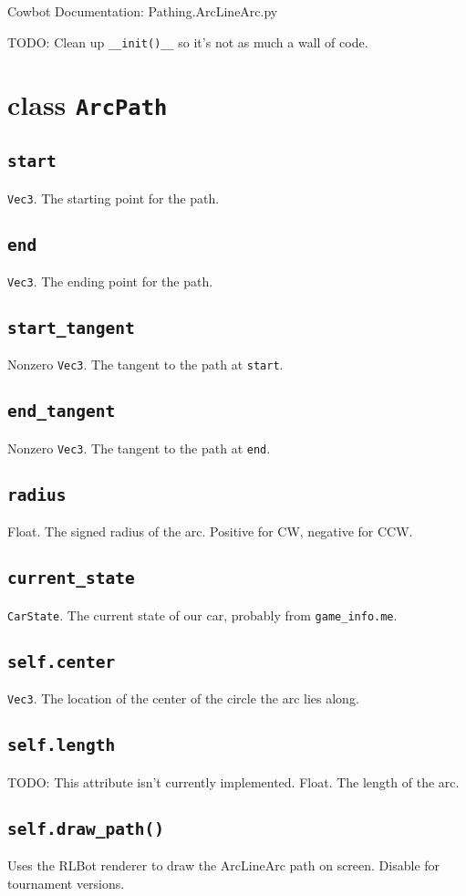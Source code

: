\documentclass{article}
\newcommand{\class}[1]{\section{class \texttt{#1}}}
\newcommand{\attribute}[1]{\subsection{\texttt{self.#1}}}
\newcommand{\method}[1]{\subsection{\texttt{self.#1}}}
\newcommand{\argumenta}[1]{\subsection{\texttt{#1}}}
\begin{document}
\begin{flushleft}

\begin{center}
  Cowbot Documentation: Pathing.ArcLineArc.py
\end{center}

TODO: Clean up \texttt{\_\_init()\_\_} so it's not as much a wall of code.


\class{ArcPath}
      {

        \argumenta{start}
                  {
                    \texttt{Vec3}.  The starting point for the path.
                  }
        \argumenta{end}
                  {
                    \texttt{Vec3}.  The ending point for the path.                    
                  }
        \argumenta{start\_tangent}
                  {
                    Nonzero \texttt{Vec3}.  The tangent to the path at \texttt{start}.
                  }
        \argumenta{end\_tangent}
                  {
                    Nonzero \texttt{Vec3}.  The tangent to the path at \texttt{end}.
                  }
        \argumenta{radius}
                  {
                    Float.  The signed radius of the arc.  Positive for CW, negative for CCW.
                  }
        \argumenta{current\_state}
                  {
                    \texttt{CarState}.  The current state of our car, probably from \texttt{game\_info.me}.
                  }


        \attribute{center}
                  {
                    \texttt{Vec3}. The location of the center of the circle the arc lies along.
                  }
        \attribute{length}
                  { TODO: This attribute isn't currently implemented.
                    Float.  The length of the arc.
                  }






        \method{draw\_path()}
               {
                 Uses the RLBot renderer to draw the ArcLineArc path on screen.  Disable for tournament versions.
               }
               



















      }
      
         









  
  





\end{flushleft}
\end{document}

